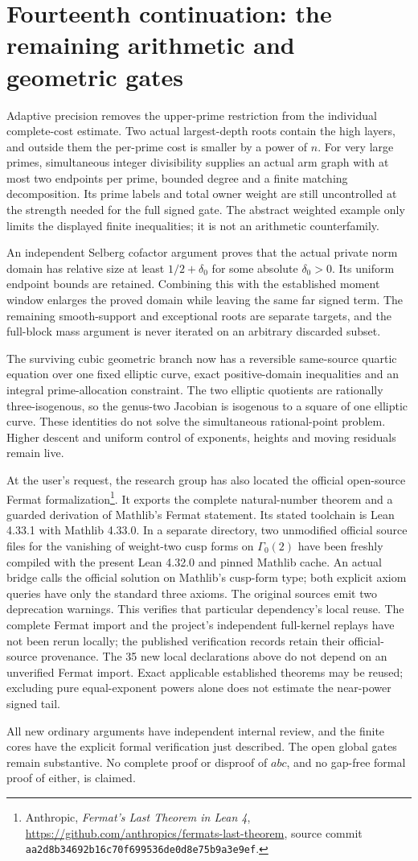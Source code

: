 \section{Fourteenth continuation: the remaining arithmetic and geometric gates}
\label{fourteenth-status}

Adaptive precision removes the upper-prime restriction from the individual
complete-cost estimate. Two actual largest-depth roots contain the high
layers, and outside them the per-prime cost is smaller by a power of $n$.
For very large primes, simultaneous integer divisibility supplies an
actual arm graph with at most two endpoints per prime, bounded degree
and a finite matching decomposition. Its prime labels and total owner
weight are still uncontrolled at the strength needed for the full signed
gate. The abstract weighted example only limits the displayed finite
inequalities; it is not an arithmetic counterfamily.

An independent Selberg cofactor argument proves that the actual private
norm domain has relative size at least $1/2+\delta_0$ for some absolute
$\delta_0>0$. Its uniform endpoint bounds are retained. Combining this
with the established moment window enlarges the proved domain while
leaving the same far signed term. The remaining smooth-support and
exceptional roots are separate targets, and the full-block mass argument
is never iterated on an arbitrary discarded subset.

The surviving cubic geometric branch now has a reversible same-source
quartic equation over one fixed elliptic curve, exact positive-domain
inequalities and an integral prime-allocation constraint. The two elliptic
quotients are rationally three-isogenous, so the genus-two Jacobian is
isogenous to a square of one elliptic curve. These identities do not
solve the simultaneous rational-point problem. Higher descent and
uniform control of exponents, heights and moving residuals remain live.

At the user's request, the research group has also located the official
open-source Fermat formalization\footnote{Anthropic,
\emph{Fermat's Last Theorem in Lean 4},
\url{https://github.com/anthropics/fermats-last-theorem}, source commit
\texttt{aa2d8b34692b16c70f699536de0d8e75b9a3e9ef}.}.
It exports the complete natural-number theorem and a guarded derivation
of Mathlib's Fermat statement. Its stated toolchain is Lean 4.33.1 with
Mathlib 4.33.0. In a separate directory, two unmodified official source
files for the vanishing of weight-two cusp forms on $\Gamma_0(2)$
have been freshly compiled with the present Lean 4.32.0 and pinned
Mathlib cache. An actual bridge calls the official solution on Mathlib's
cusp-form type; both explicit axiom queries have only the standard
three axioms. The original sources emit two deprecation warnings.
This verifies that particular dependency's local reuse. The complete
Fermat import and the project's independent full-kernel replays have
not been rerun locally; the published verification records retain
their official-source provenance. The 35 new local declarations
above do not depend on an unverified Fermat import.
Exact applicable established theorems may be reused; excluding pure
equal-exponent powers alone does not estimate the near-power signed tail.

All new ordinary arguments have independent internal review, and the
finite cores have the explicit formal verification just described.
The open global gates remain substantive. No complete proof or disproof
of $abc$, and no gap-free formal proof of either, is claimed.
